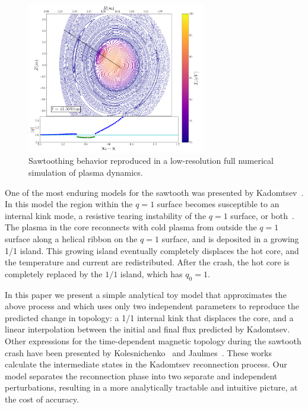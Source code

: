 \documentclass[%
superscriptaddress,
amsmath,amssymb,
aps,
pre,
floatfix,
]{revtex4-2}
\begin{document}
\begin{figure}
    \centering
    \includegraphics[width=0.7\textwidth]{fullfig149.png}
    \caption{Sawtoothing behavior reproduced in a low-resolution full numerical simulation of plasma dynamics.}
    \label{fig:my_label}
\end{figure}

One of the most enduring models for the sawtooth was presented by Kadomtsev~\cite{kadomtsev1975disruptive}.
In this model the region within the $q=1$ surface becomes susceptible to an internal kink mode, a resistive tearing instability of the $q=1$ surface, or both~\cite{coppi1976resistive}.
The plasma in the core reconnects with cold plasma from outside the $q=1$ surface along a helical ribbon on the $q=1$ surface, and is deposited in a growing 1/1 island.
This growing island eventually completely displaces the hot core, and the temperature and current are redistributed.
After the crash, the hot core is completely replaced by the $1/1$ island, which has $q_0=1$.

In this paper we present a simple analytical toy model that approximates the above process and which uses only  two independent parameters to reproduce the predicted change in topology: a 1/1 internal kink that displaces the core, and a linear interpolation between the initial and final flux predicted by Kadomtsev.
Other expressions for the time-dependent magnetic topology during the sawtooth crash have been presented by Kolesnichenko~\cite{kolesnichenko1996theory} and Jaulmes~\cite{jaulmes2014redistribution}.
These works calculate the intermediate states in the Kadomtsev reconnection process. 
Our model separates the reconnection phase into two separate and independent perturbations, resulting in a more analytically tractable and intuitive picture, at the cost of accuracy.
\end{document}
